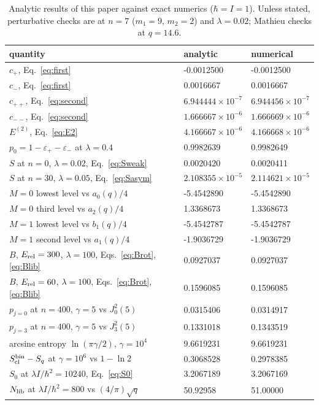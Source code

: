 \documentclass[preprint,12pt]{elsarticle}
\newcommand{\epsp}{\varepsilon_{+}}
\newcommand{\epsm}{\varepsilon_{-}}
\newcommand{\Erel}{E_{\rm rel}}
\newcommand{\Scl}{S_{\rm cl}}
\begin{document}
\begin{table}[h]
\centering
\caption{Analytic results of this paper against exact numerics
($\hbar=I=1$). Unless stated, perturbative checks are at $n=7$
($m_{1}=9$, $m_{2}=2$) and $\lambda=0.02$; Mathieu checks at $q=14.6$.}
\label{tab:checks}
\small
\renewcommand{\arraystretch}{1.15}
\begin{tabular}{lll}
\toprule
quantity & analytic & numerical\\
\midrule
$c_{+}$, Eq.~\eqref{eq:first} & -0.0012500 & -0.0012500 \\
$c_{-}$, Eq.~\eqref{eq:first} & 0.0016667 & 0.0016667 \\
$c_{++}$, Eq.~\eqref{eq:second} & $6.944444\times10^{-7}$ & $6.944456\times10^{-7}$ \\
$c_{--}$, Eq.~\eqref{eq:second} & $1.666667\times10^{-6}$ & $1.666669\times10^{-6}$ \\
$E^{(2)}$, Eq.~\eqref{eq:E2} & $4.166667\times10^{-6}$ & $4.166668\times10^{-6}$ \\
$p_{0}=1-\epsp-\epsm$ at $\lambda=0.4$ & 0.9982639 & 0.9982649 \\
$S$ at $n=0$, $\lambda=0.02$, Eq.~\eqref{eq:Sweak} & 0.0020420 & 0.0020411 \\
$S$ at $n=30$, $\lambda=0.05$, Eq.~\eqref{eq:Sasym} & $2.108355\times10^{-5}$ & $2.114621\times10^{-5}$ \\
$M=0$ lowest level vs $a_{0}(q)/4$ & -5.4542890 & -5.4542890 \\
$M=0$ third level vs $a_{2}(q)/4$ & 1.3368673 & 1.3368673 \\
$M=1$ lowest level vs $b_{1}(q)/4$ & -5.4542787 & -5.4542787 \\
$M=1$ second level vs $a_{1}(q)/4$ & -1.9036729 & -1.9036729 \\
$B$, $\Erel=300$, $\lambda=100$, Eqs.~\eqref{eq:Brot},\eqref{eq:Blib} & 0.0927037 & 0.0927037 \\
$B$, $\Erel=60$, $\lambda=100$, Eqs.~\eqref{eq:Brot},\eqref{eq:Blib} & 0.1596085 & 0.1596085 \\
$p_{j=0}$ at $n=400$, $\gamma=5$ vs $J_{0}^{2}(5)$ & 0.0315406 & 0.0314917 \\
$p_{j=3}$ at $n=400$, $\gamma=5$ vs $J_{3}^{2}(5)$ & 0.1331018 & 0.1343519 \\
arcsine entropy $\ln(\pi\gamma/2)$, $\gamma=10^{4}$ & 9.6619231 & 9.6619231 \\
$\Scl^{\rm bin}-S_{q}$ at $\gamma=10^{6}$ vs $1-\ln2$ & 0.3068528 & 0.2978385 \\
$S_{0}$ at $\lambda I/\hbar^{2}=10240$, Eq.~\eqref{eq:S0} & 3.2067189 & 3.2067169 \\
$N_{\rm lib}$ at $\lambda I/\hbar^{2}=800$ vs $(4/\pi)\sqrt q$ & 50.92958 & 51.00000 \\
\bottomrule
\end{tabular}
\end{table}
\end{document}
